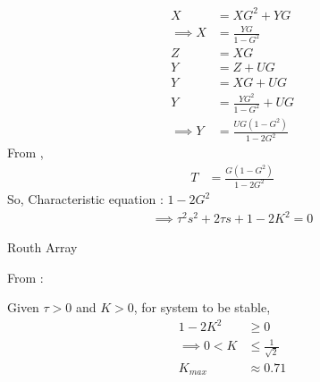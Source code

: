 \documentclass[journal,12pt,twocolumn]{IEEEtran}
\theoremstyle{remark}
\begin{document}
\begin{align}
X &= XG^2+YG \\
\implies X &= \frac{YG}{1-G^2}\\
Z &= XG\\
Y &= Z+UG\\
Y &= XG+UG\\
Y &= \frac{YG^2}{1-G^2}+UG\\
\implies Y &= \frac{UG(1-G^2)}{1-2G^2} 
\end{align}
From ,
\begin{align}
T &= \frac{G(1-G^2)}{1-2G^2}
\end{align}
So, Characteristic equation : $1-2G^2$ 
\begin{align}
\implies \tau^2s^2+2\tau s+1-2K^2 = 0
\end{align}
\begin{table}[htbp]
\setlength{\extrarowheight}{8pt}
\centering

\caption{Routh Array}
\label{tab:generalroutharray}
\end{table}
\newline
From :

\begin{table}[htbp]
\setlength{\extrarowheight}{8pt}
\centering

\caption{}
\label{tab:inputs.IN.24.2023}
\end{table}


Given $\tau>0$ and $K>0$, for system to be stable,
\begin{align}
1-2K^2&\geq 0\\
\implies 0 < K&\leq \frac{1}{\sqrt{2}}\\
K_{max} &\approx 0.71
\end{align}
\end{document}

